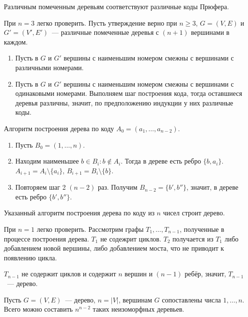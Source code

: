 \begin{statement}
	Различным помеченным деревьям соответствуют различные коды Прюфера.
\end{statement}
\begin{proofmathind}
	\indbase При $n = 3$ легко проверить.
	\indstep Пусть утверждение верно при $n \geqslant 3$, $G = (V, E)$ и $G' = (V', E')$~--- различные помеченные деревья с $(n + 1)$ вершинами в каждом.
	\begin{enumerate}
		\item Пусть в $G$ и $G'$ вершины с наименьшим номером смежны с вершинами с различными номерами.
		\item Пусть в $G$ и $G'$ вершины с наименьшим номером смежны с вершинами с одинаковыми номерами. Выполняем шаг построения кода, тогда оставшиеся деревья различны, значит, по предположению индукции у них различные коды.
	\end{enumerate}
	\indend
\end{proofmathind}

	Алгоритм построения дерева по коду $A_0 = (a_1, \ldots, a_{n-2})$.
\begin{enumerate}
	\item Пусть $B_0 = (1, \ldots, n)$.
	\item Находим наименьшее $b \in B_i \colon b \notin A_i$. Тогда в дереве есть ребро $\{ b, a_i \}$. $A_{i+1} = A_i \setminus \{ a_i \}$, $B_{i+1} = B_i \setminus \{ b \}$.
	\item Повторяем шаг 2 $(n - 2)$ раз. Получим $B_{n-2} = \{ b', b'' \}$, значит, в дереве есть ребро $\{ b', b'' \}$.
\end{enumerate}

\begin{statement}
	Указанный алгоритм построения дерева по коду из $n$ чисел строит дерево.
\end{statement}
\begin{proofmathind}
	\indbase При $n = 1$ легко проверить.
	\indstep Рассмотрим графы $T_1, \ldots, T_{n-1}$, полученные в процессе построения дерева. $T_1$ не содежрит циклов. $T_2$ получается из $T_1$ либо добавлением новой вершины, либо добавлением моста, что не приводит к появлению цикла.
	
	$T_{n-1}$ не содержит циклов и содержит $n$ вершин и $(n - 1)$ ребёр, значит, $T_{n-1}$~--- дерево.
	\indend
\end{proofmathind}

\begin{theorem}[Кэли]
	Пусть $G = (V, E)$~--- дерево, $n = |V|$, вершинам $G$ сопоставлены числа $1, \ldots, n$. Всего можно составить $n^{n-2}$ таких неизоморфных деревьев.
\end{theorem}
